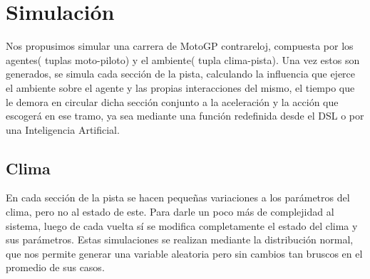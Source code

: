 \documentclass[12pt, letterpaper,spanish]{article}
\theoremstyle{definition}
\theoremstyle{remark}
\begin{document}
\section{Simulación}\cite{conferenciasS}\cite{garcia}
	Nos propusimos simular una carrera de MotoGP contrareloj, compuesta por los agentes( tuplas moto-piloto) y el ambiente( tupla clima-pista). Una vez estos son generados, se simula cada sección de la pista, calculando la influencia que ejerce el ambiente sobre el agente y las propias interacciones del mismo, el tiempo que le demora en circular dicha sección conjunto a la aceleración y la acción que escogerá en ese tramo, ya sea mediante una función redefinida desde el DSL o por una Inteligencia Artificial.
	
	\subsection{Clima}
	En cada sección de la pista se hacen pequeñas variaciones a los parámetros del clima, pero no al estado de este. Para darle un poco más de complejidad al sistema, luego de cada vuelta sí se modifica completamente el estado del clima y sus parámetros. Estas simulaciones se realizan mediante la distribución normal, que nos permite generar una variable aleatoria pero sin cambios tan bruscos en el promedio de sus casos.
	
\end{document}
